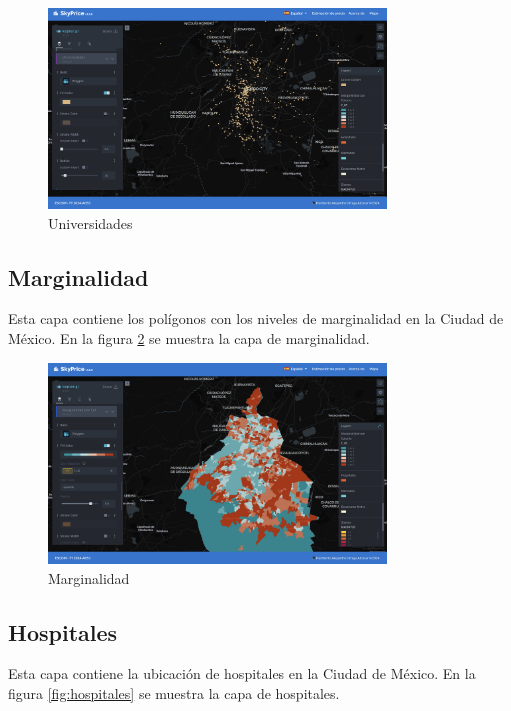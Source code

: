 \begin{figure}[H]
    \centering
    \includegraphics[width=0.8\textwidth]{imagenes/05-mapa-interactivo/universidades.png}
    \caption{Universidades}
    \label{fig:universidades}
\end{figure}

\subsection{Marginalidad}
Esta capa contiene los polígonos con los niveles de marginalidad en la Ciudad de
México. En la figura \ref{fig:marginalidad} se muestra la capa de marginalidad.

\begin{figure}[H]
    \centering
    \includegraphics[width=0.8\textwidth]{imagenes/05-mapa-interactivo/marginalidad.png}
    \caption{Marginalidad}
    \label{fig:marginalidad}
\end{figure}

\subsection{Hospitales}
Esta capa contiene la ubicación de hospitales en la Ciudad de México. En la figura
\ref{fig:hospitales} se muestra la capa de hospitales.

